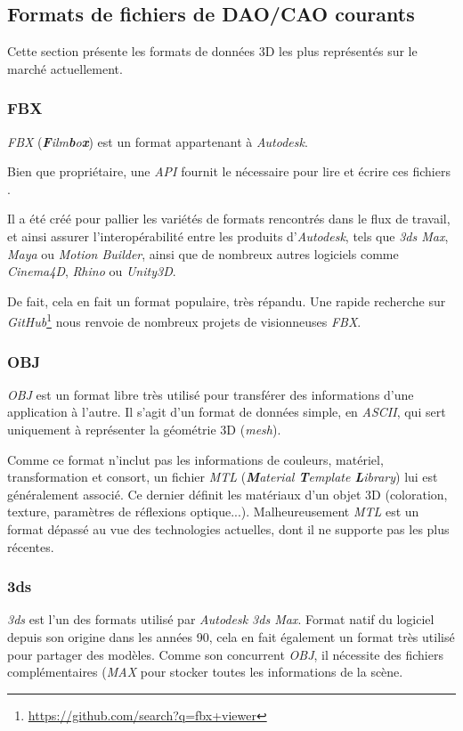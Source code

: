 \subsection{Formats de fichiers de DAO/CAO courants}
\label{sec:main-3d-file-formats}

Cette section présente les formats de données 3D les plus représentés sur le marché actuellement.

\subsubsection{FBX}
\textit{FBX} (\textit{\textbf{F}ilm\textbf{b}o\textbf{x}}) est un format appartenant à \textit{Autodesk}.

Bien que propriétaire, une \textit{API} fournit le nécessaire pour lire et écrire ces fichiers \cite{fbx-api}.

Il a été créé pour pallier les variétés de formats rencontrés dans le flux de travail, et ainsi assurer l'interopérabilité entre les produits d'\textit{Autodesk}, tels que \textit{3ds Max}, \textit{Maya} ou \textit{Motion Builder}, ainsi que de nombreux autres logiciels comme \textit{Cinema4D}, \textit{Rhino} ou \textit{Unity3D}.

De fait, cela en fait un format populaire, très répandu.
Une rapide recherche sur \textit{GitHub}\footnote{\url{https://github.com/search?q=fbx+viewer}} nous renvoie de nombreux projets de visionneuses \textit{FBX}.

\subsubsection{OBJ}
\textit{OBJ} est un format libre très utilisé pour transférer des informations d'une application à l'autre. Il s'agit d'un format de données simple, en \textit{ASCII}, qui sert uniquement à représenter la géométrie 3D (\textit{mesh}).

Comme ce format n'inclut pas les informations de couleurs, matériel, transformation et consort, un fichier \textit{MTL} (\textit{\textbf{M}aterial \textbf{T}emplate \textbf{L}ibrary}) lui est généralement associé. Ce dernier définit les matériaux d'un objet 3D (coloration, texture, paramètres de réflexions optique...). Malheureusement \textit{MTL} est un format dépassé au vue des technologies actuelles, dont il ne supporte pas les plus récentes.

\subsubsection{3ds}
\textit{3ds} est l'un des formats utilisé par \textit{Autodesk 3ds Max}. Format natif du logiciel depuis son origine dans les années 90, cela en fait également un format très utilisé pour partager des modèles. Comme son concurrent \textit{OBJ}, il nécessite des fichiers complémentaires (\textit{MAX} pour stocker toutes les informations de la scène.

